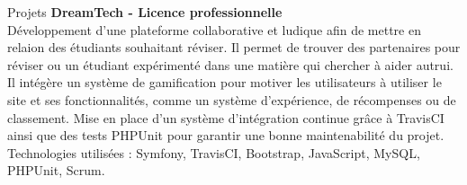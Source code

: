 \documentclass[
	11pt, %
]{resume} %
\begin{document}
\begin{rSection}{Projets}
	{\bf DreamTech - Licence professionnelle}
	\\Développement d'une plateforme collaborative et ludique afin de mettre en relaion des étudiants souhaitant réviser. 
	Il permet de trouver des partenaires pour réviser ou un étudiant expérimenté dans une matière qui chercher à aider autrui. 
	Il intégère un système de gamification pour motiver les utilisateurs à utiliser le site et ses fonctionnalités, comme un système d'expérience, de récompenses ou de classement. 
	Mise en place d'un système d'intégration continue grâce à TravisCI ainsi que des tests PHPUnit pour garantir une bonne maintenabilité du projet.
	\\ Technologies utilisées : Symfony, TravisCI, Bootstrap, JavaScript, MySQL, PHPUnit, Scrum.

\end{rSection}
\end{document}
